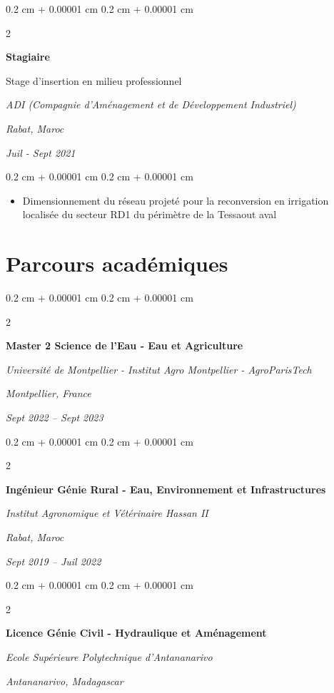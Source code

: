 \documentclass[10pt, letterpaper]{article}
\newenvironment{highlights}{
  \begin{itemize}[
    topsep=0.10 cm,
    parsep=0.10 cm,
    partopsep=0pt,
    itemsep=0pt,
    leftmargin=0.4 cm + 10pt
  ]
}{
  \end{itemize}
} %
\newenvironment{onecolentry}{
  \begin{adjustwidth}{
    0.2 cm + 0.00001 cm
  }{
    0.2 cm + 0.00001 cm
  }
}{
  \end{adjustwidth}
} %
\newenvironment{twocolentry}[2][]{
  \onecolentry
  \def\secondColumn{#2}
  \setcolumnwidth{\fill, 4.5 cm}
  \begin{paracol}{2}
}{
  \switchcolumn \raggedleft \secondColumn
  \end{paracol}
  \endonecolentry
} %
\begin{document}
\begin{twocolentry}
  {
    \textit{Rabat, Maroc}

    \textit{Juil - Sept 2021}
  }
  {
    \textbf{Stagiaire}

    Stage d'insertion en milieu professionnel

    \textit{ADI (Compagnie d'Aménagement et de Développement Industriel)}
  }
\end{twocolentry}

\vspace{0.10 cm}

\begin{onecolentry}
  \begin{highlights}
    \item Dimensionnement du réseau projeté pour la reconversion en irrigation
    localisée du secteur RD1 du périmètre de la Tessaout aval
  \end{highlights}
\end{onecolentry}
  
\section{Parcours académiques}
\begin{twocolentry}
  {
  \textit{Montpellier, France}

  \textit{Sept 2022 – Sept 2023}
  }
  {
    \textbf{Master 2 Science de l'Eau - Eau et Agriculture}

    \textit{Université de Montpellier - Institut Agro Montpellier - AgroParisTech}
  }
\end{twocolentry}

\vspace{0.2 cm}

\begin{twocolentry}
  {
    \textit{Rabat, Maroc}

    \textit{Sept 2019 – Juil 2022}
  }
  {
    \textbf{Ingénieur Génie Rural - Eau, Environnement et Infrastructures}

    \textit{Institut Agronomique et Vétérinaire Hassan II}
  }
\end{twocolentry}

\vspace{0.2 cm}


\begin{twocolentry}
  {
    \textit{Antananarivo, Madagascar}

    \textit{}
  }
  {
    \textbf{Licence Génie Civil - Hydraulique et Aménagement}

    \textit{Ecole Supérieure Polytechnique d'Antananarivo}
  }
\end{twocolentry}
\end{document}
